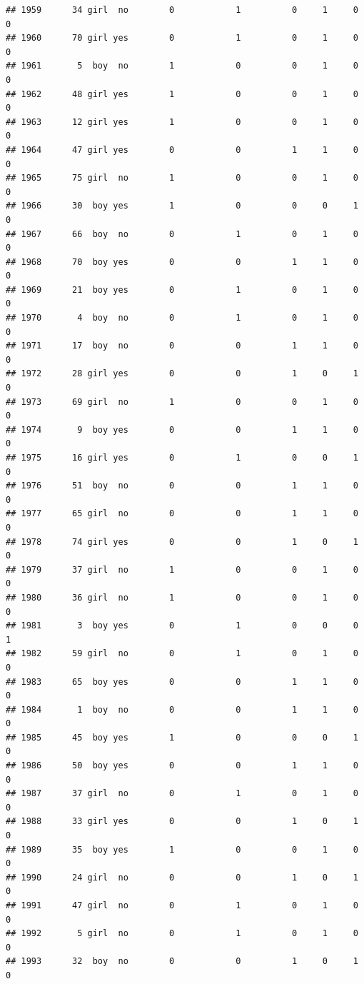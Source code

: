 \documentclass[man]{apa6}
\begin{document}
\begin{verbatim}
## 1959      34 girl  no        0            1          0     1     0     0
## 1960      70 girl yes        0            1          0     1     0     0
## 1961       5  boy  no        1            0          0     1     0     0
## 1962      48 girl yes        1            0          0     1     0     0
## 1963      12 girl yes        1            0          0     1     0     0
## 1964      47 girl yes        0            0          1     1     0     0
## 1965      75 girl  no        1            0          0     1     0     0
## 1966      30  boy yes        1            0          0     0     1     0
## 1967      66  boy  no        0            1          0     1     0     0
## 1968      70  boy yes        0            0          1     1     0     0
## 1969      21  boy yes        0            1          0     1     0     0
## 1970       4  boy  no        0            1          0     1     0     0
## 1971      17  boy  no        0            0          1     1     0     0
## 1972      28 girl yes        0            0          1     0     1     0
## 1973      69 girl  no        1            0          0     1     0     0
## 1974       9  boy yes        0            0          1     1     0     0
## 1975      16 girl yes        0            1          0     0     1     0
## 1976      51  boy  no        0            0          1     1     0     0
## 1977      65 girl  no        0            0          1     1     0     0
## 1978      74 girl yes        0            0          1     0     1     0
## 1979      37 girl  no        1            0          0     1     0     0
## 1980      36 girl  no        1            0          0     1     0     0
## 1981       3  boy yes        0            1          0     0     0     1
## 1982      59 girl  no        0            1          0     1     0     0
## 1983      65  boy yes        0            0          1     1     0     0
## 1984       1  boy  no        0            0          1     1     0     0
## 1985      45  boy yes        1            0          0     0     1     0
## 1986      50  boy yes        0            0          1     1     0     0
## 1987      37 girl  no        0            1          0     1     0     0
## 1988      33 girl yes        0            0          1     0     1     0
## 1989      35  boy yes        1            0          0     1     0     0
## 1990      24 girl  no        0            0          1     0     1     0
## 1991      47 girl  no        0            1          0     1     0     0
## 1992       5 girl  no        0            1          0     1     0     0
## 1993      32  boy  no        0            0          1     0     1     0

\end{verbatim}
\end{document}
